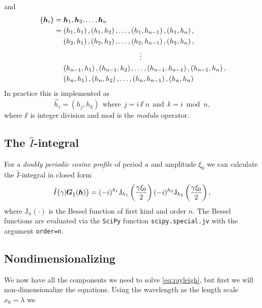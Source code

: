 and
\begin{align*}
    &\cbr{\vec h_i} = \vec h_1, \vec h_2, \dots, \vec h_n \\
    &\phantom{\cbr{\vec h_i}{}} = \del{h_1, h_1}, \del{h_1, h_2}, \dots, \del{h_1, h_{n-1}}, \del{h_1, h_n}, \\
    &\phantom{\cbr{\vec h_i} = {}} \del{h_2, h_1}, \del{h_2, h_2}, \dots, \del{h_2, h_{n-1}}, \del{h_2, h_n}, \\
    &\hspace{5cm} \vdots \\
    &\phantom{\cbr{\vec h_i} = {}} \del{h_{n-1}, h_1}, \del{h_{n-1}, h_2}, \dots, \del{h_{n-1}, h_{n-1}}, \del{h_{n-1}, h_n}, \\
    &\phantom{\cbr{\vec h_i} = {}} \del{h_n, h_1}, \del{h_n, h_2}, \dots, \del{h_n, h_{n-1}}, \del{h_n, h_n} \\
\end{align*}
In practice this is implemented as
\begin{equation}
    \vec h_ i = (h_j, h_k) ~~\text{where}~~ j = i \sslash n ~~\text{and}~~ k = i \bmod n,
\end{equation}
where $\sslash$ is integer division and $\mathrm{mod}$ is the \emph{modulo} operator.

\subsection*{The $\hat I$-integral}
For a \emph{doubly periodic cosine profile} of period $a$ and amplitude $\xi_0$ we can calculate the $\hat I$-integral in closed form
\begin{equation}
    \hat I\del[1]{\gamma\vert \vec G_\|(\vec h)} = (-i)^{h_1} \mathrm{J}_{h_1}\del{\frac{\gamma\xi_0}{2}} (-i)^{h_2} \mathrm{J}_{h_2}\del{\frac{\gamma\xi_0}{2}},
\end{equation}
where $\mathrm{J}_n(\cdot)$ is the Bessel function of first kind and order $n$. The Bessel functions are evaluated via the \texttt{SciPy} function \texttt{scipy.special.jv} with the argument \texttt{order=n}.

\subsection*{Nondimensionalizing}
We now have all the components we need to solve \cref{eq:rayleigh}, but first we will non-dimensionalize the equations. Using the wavelength as the length scale $x_0 = \lambda$ we 